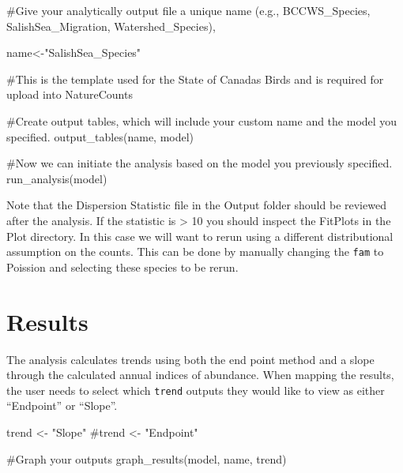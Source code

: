 \documentclass[
  letterpaper,
  DIV=11,
  numbers=noendperiod]{scrreprt}
\newenvironment{Shaded}{\begin{snugshade}}{\end{snugshade}}
\newcommand{\CommentTok}[1]{\textcolor[rgb]{0.37,0.37,0.37}{#1}}
\newcommand{\FunctionTok}[1]{\textcolor[rgb]{0.28,0.35,0.67}{#1}}
\newcommand{\NormalTok}[1]{\textcolor[rgb]{0.00,0.23,0.31}{#1}}
\newcommand{\OtherTok}[1]{\textcolor[rgb]{0.00,0.23,0.31}{#1}}
\newcommand{\StringTok}[1]{\textcolor[rgb]{0.13,0.47,0.30}{#1}}
\begin{document}
\begin{Shaded}
\begin{Highlighting}[]
\CommentTok{\#Give your analytically output file a unique name (e.g., BCCWS\_Species, SalishSea\_Migration, Watershed\_Species), }

\NormalTok{name}\OtherTok{\textless{}{-}}\StringTok{"SalishSea\_Species"}

\CommentTok{\#This is the template used for the State of Canada\textquotesingle{}s Birds and is required for upload into NatureCounts}

\CommentTok{\#Create output tables, which will include your custom name and the \textasciigrave{}model\textasciigrave{} you specified.}
\FunctionTok{output\_tables}\NormalTok{(name, model)}

\CommentTok{\#Now we can initiate the analysis based on the \textasciigrave{}model\textasciigrave{} you previously specified.   }
\FunctionTok{run\_analysis}\NormalTok{(model)}
\end{Highlighting}
\end{Shaded}

Note that the Dispersion Statistic file in the Output folder should be
reviewed after the analysis. If the statistic is \textgreater{} 10 you
should inspect the FitPlots in the Plot directory. In this case we will
want to rerun using a different distributional assumption on the counts.
This can be done by manually changing the \texttt{fam} to Poission and
selecting these species to be rerun.

\section{Results}\label{3.3Vis}

The analysis calculates trends using both the end point method and a
slope through the calculated annual indices of abundance. When mapping
the results, the user needs to select which \texttt{trend} outputs they
would like to view as either ``Endpoint'' or ``Slope''.

\begin{Shaded}
\begin{Highlighting}[]
\NormalTok{trend }\OtherTok{\textless{}{-}} \StringTok{"Slope"} 
\CommentTok{\#trend \textless{}{-} "Endpoint"}

\CommentTok{\#Graph your outputs}
\FunctionTok{graph\_results}\NormalTok{(model, name, trend)}
\end{Highlighting}
\end{Shaded}
\end{document}

